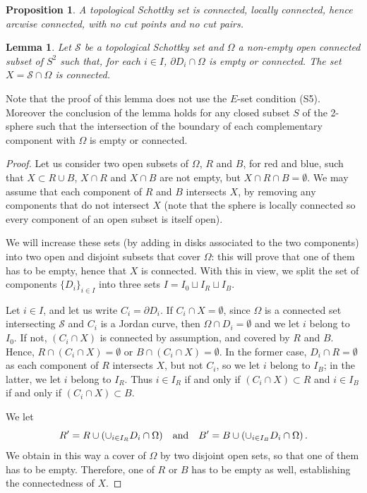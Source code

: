 \documentclass[11pt]{article}
\newtheorem{lemma}[theorem]{Lemma}
\newtheorem{proposition}[theorem]{Proposition}
\theoremstyle{definition}
\begin{document}
\begin{proposition}\label{prop:schotoprop}
A topological Schottky set is connected, locally connected, hence arcwise connected, with no cut points and no cut pairs.

\end{proposition} 

\begin{lemma}\label{lma:semilocalcnd}
Let $\mathcal{S}$ be a topological Schottky set and $\Omega$ a non-empty open connected subset of $S^2$ such that, for each $i\in I$, $\partial D_i\cap \Omega$ is empty or connected.
The set $X = \mathcal{S}\cap \Omega$ is connected.
\end{lemma}
Note that the proof of this lemma does not use the $E$-set condition (S5). Moreover the conclusion of the lemma holds for any closed subset $S$ of the 2-sphere such that the intersection of the boundary of each complementary component with $\Omega$ is empty or connected. 
\begin{proof} 
 Let us consider two open subsets of $\Omega$, $R$ and $B$, for red and blue, such that $X\subset R\cup B$, $X\cap R$ 
 and $X\cap B$ are not empty, but $X\cap R \cap B=\emptyset$.
 We may assume that each component of $R$ and $B$ intersects $X$, by removing any components that do not intersect $X$ (note that the sphere is locally connected so every component of an open subset is itself open). 

We will increase these sets (by adding in disks associated to the two components) into two open and disjoint subsets that cover $\Omega$: this will prove that one of them has to be empty,
hence that $X$ is connected. With this in view, we split the set of components $\{D_i\}_{i\in I}$ into three sets  $I=I_0\sqcup I_R \sqcup I_B$.



Let $i\in I$, and let us write  $C_i= \partial D_i$. If $C_i\cap X=\emptyset$, since $\Omega$ is a connected set intersecting $\mathcal{S}$ and $C_i$ is a Jordan curve, then $\Omega\cap D_i=\emptyset$ and we let $i$ belong to $I_0$.   If not, $(C_i\cap X)$ is connected
by assumption, and covered by $R$ and $B$. Hence, $R\cap (C_i\cap X)=\emptyset$ or $B\cap (C_i\cap X)=\emptyset$. In the former
case, $D_i\cap R=\emptyset$ as each component of $R$ intersects $X$, but not $C_i$, so we let $i$ belong to $I_B$; in the latter, we let $i$ belong to $I_R$. Thus $i\in I_R$ if and only if $(C_i\cap X)\subset R$
and  $i\in I_B$ if and only if $(C_i\cap X)\subset B$. 

We let $$R'= R \cup (\cup_{i\in I_R} D_i \cap \Omega)\quad \hbox{and} \quad B'= B \cup (\cup_{i\in I_B} D_i\cap\Omega)\,.$$
We obtain in this way a cover of $\Omega$ by two disjoint open sets, so that one of them has to be empty. Therefore, one
of $R$ or $B$ has to be empty as well, establishing the connectedness of $X$. 
\end{proof}
\end{document}
